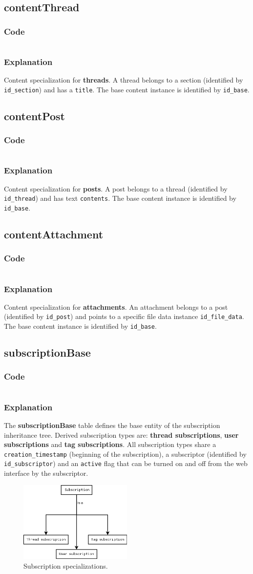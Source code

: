 \documentclass[12pt]{report}
\renewcommand\emph{\textbf}
\newcommand{\printSQLtest}[1]
{
    \inputminted[linenos, breaklines, breakbytoken, tabsize=4, fontsize=\footnotesize]{mysql}{#1}
}
\newcommand{\printSQLTablepage}[2]
{    
    \subsection{#2}
    \subsubsection{Code}
    \printSQLtest{../sql/parts/#1}
    \subsubsection{Explanation}
}
\begin{document}
                \printSQLTablepage{08_tblContentThread.sql}{contentThread}
                    Content specialization for \emph{threads}. A thread belongs to a section (identified by \texttt{id_section}) and has a \texttt{title}.
                    The base content instance is identified by \texttt{id_base}.

                \newpage

                \printSQLTablepage{09_tblContentPost.sql}{contentPost}
                    Content specialization for \emph{posts}. A post belongs to a thread (identified by \texttt{id_thread}) and has text \texttt{contents}.
                    The base content instance is identified by \texttt{id_base}.

                \newpage

                \printSQLTablepage{10_tblContentAttachment.sql}{contentAttachment}
                    Content specialization for \emph{attachments}. An attachment belongs to a post (identified by \texttt{id_post}) and points to a specific file data instance \texttt{id_file_data}.
                    The base content instance is identified by \texttt{id_base}.

                \newpage

                \printSQLTablepage{11_tblSubscriptionBase.sql}{subscriptionBase}
                    The \emph{subscriptionBase} table defines the base entity of the subscription inheritance tree. Derived subscription types are: \emph{thread subscriptions}, \emph{user subscriptions} and \emph{tag subscriptions}.
                    All subscription types share a \texttt{creation_timestamp} (beginning of the subscription), a subscriptor (identified by \texttt{id_subscriptor}) and an \texttt{active} flag that can be turned on and off from the web interface by the subscriptor.

                    \begin{figure}[!htb]
                    \caption{Subscription specializations.}
                    \centering
                    \includegraphics[width=0.5\textwidth]{td/11subscriptionbase}
                    \end{figure}
\end{document}
